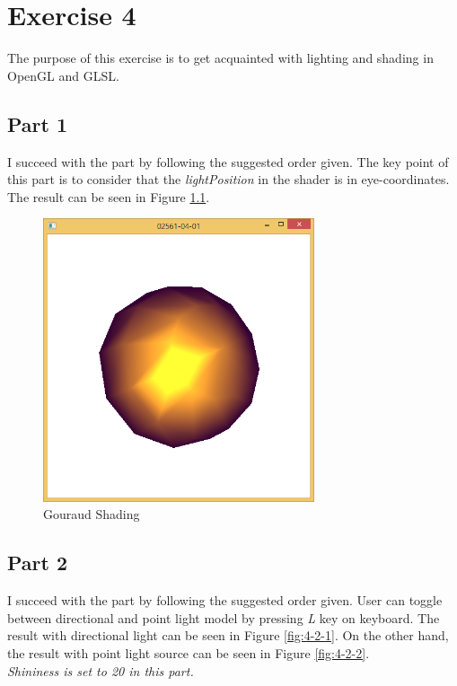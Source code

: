 
\chapter{Exercise 4}
\label{cha:ugeopgave-4}

The purpose of this exercise is to get acquainted with lighting and shading in OpenGL and GLSL.

\section{Part 1}
\label{sec:del-1:-newpaint}

I succeed with the part by following the suggested order given. The key point of this part is to consider that the \emph{lightPosition} in the shader is in eye-coordinates.\\
The result can be seen in Figure \ref{fig:4-1}.




\begin{figure}[hp]
\centering
\includegraphics[width=8cm]{../Screenshots/ex-4/1.png}
\caption{Gouraud Shading}
\label{fig:4-1}
\end{figure}










\section{Part 2}
\label{sec:del-2:-select-pick-picks}


I succeed with the part by following the suggested order given. User can toggle between directional and point light model by pressing \emph{L} key on keyboard.
The result with directional light can be seen in Figure \ref{fig:4-2-1}. On the other hand, the result with point light source can be seen in Figure \ref{fig:4-2-2}.\\
\emph{Shininess is set to 20 in this part.}



